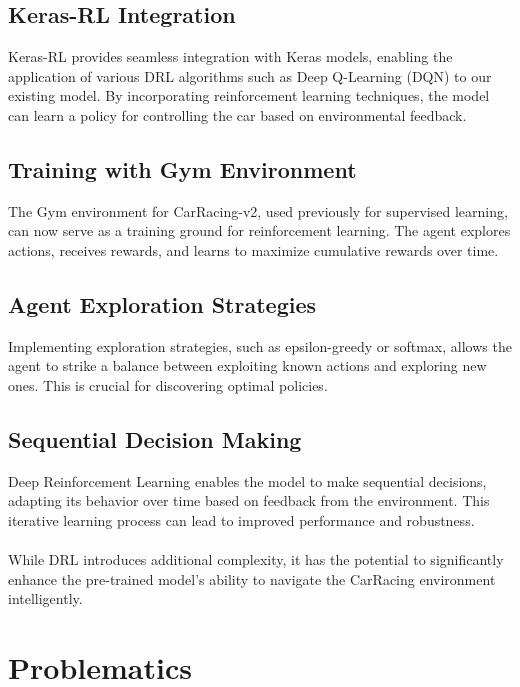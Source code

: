 \documentclass{article}
\begin{document}
\subsection{Keras-RL Integration}

Keras-RL provides seamless integration with Keras models, enabling the application of various DRL algorithms such as Deep Q-Learning (DQN) to our existing model. By incorporating reinforcement learning techniques, the model can learn a policy for controlling the car based on environmental feedback.

\subsection{Training with Gym Environment}

The Gym environment for CarRacing-v2, used previously for supervised learning, can now serve as a training ground for reinforcement learning. The agent explores actions, receives rewards, and learns to maximize cumulative rewards over time.

\subsection{Agent Exploration Strategies}

Implementing exploration strategies, such as epsilon-greedy or softmax, allows the agent to strike a balance between exploiting known actions and exploring new ones. This is crucial for discovering optimal policies.

\subsection{Sequential Decision Making}

Deep Reinforcement Learning enables the model to make sequential decisions, adapting its behavior over time based on feedback from the environment. This iterative learning process can lead to improved performance and robustness.
\\
\\
While DRL introduces additional complexity, it has the potential to significantly enhance the pre-trained model's ability to navigate the CarRacing environment intelligently.

\section{Problematics}
\end{document}
